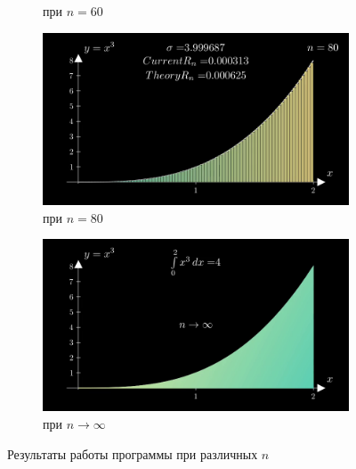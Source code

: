 \documentclass[a4paper, 11pt]{article}
\begin{document}
\begin{figure}
\begin{center}
\begin{subfigure}{0.45\linewidth}
				\caption{при $n=60$}
			\end{subfigure}
			\begin{subfigure}{0.45\linewidth}
				\includegraphics[width=\linewidth]{"./80.png"}
				\caption{при $n=80$}
			\end{subfigure}
			\begin{subfigure}{0.45\linewidth}
				\includegraphics[width=\linewidth]{"./full.png"}
				\caption{при $n\to\infty$}
			\end{subfigure}
		\caption{Результаты работы программы при различных $n$}\label{result}
		\end{center}
	\end{figure}
\end{document}
